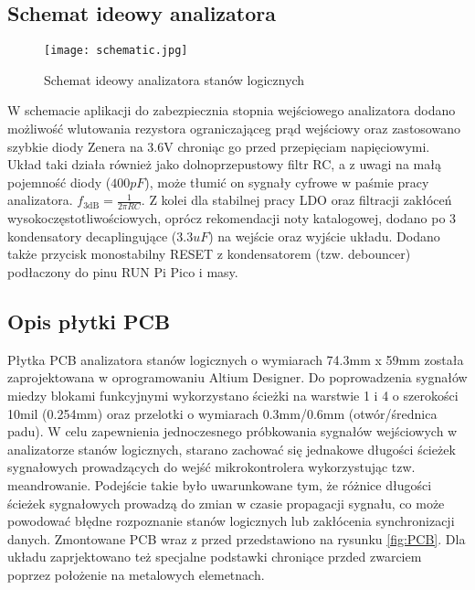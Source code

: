 \useNormalLandscape{}
\subsection{Schemat ideowy analizatora}
    \begin{figure}[!ht]
        \centering
        \texttt{[image: schematic.jpg]}
        \caption{Schemat ideowy analizatora stanów logicznych}
    \end{figure}
\usePortrait{}

    W schemacie aplikacji do zabezpiecznia stopnia wejściowego analizatora dodano możliwość wlutowania rezystora ograniczająceg
    prąd wejściowy oraz zastosowano szybkie diody Zenera na 3.6V chroniąc go przed przepięciam napięciowymi. Układ taki działa
    również jako dolnoprzepustowy filtr RC, a z uwagi na małą pojemność diody ($400pF$), może tłumić on sygnały cyfrowe w paśmie
    pracy analizatora.
    $f_{3\mathrm{dB}} = \frac{1}{2\pi RC}$. 
    Z kolei dla stabilnej pracy LDO oraz filtracji zakłóceń wysokoczęstotliwościowych, oprócz rekomendacji
    noty katalogowej, dodano po 3 kondensatory decaplingujące ($3.3uF$) na wejście oraz wyjście układu. Dodano także
    przycisk monostabilny RESET z kondensatorem (tzw. debouncer) podłaczony do pinu RUN Pi Pico i masy.




\subsection{Opis płytki PCB}

    Płytka PCB analizatora stanów logicznych o wymiarach 74.3mm x 59mm została zaprojektowana w oprogramowaniu Altium Designer.
    Do poprowadzenia sygnałów miedzy blokami funkcyjnymi wykorzystano ścieżki na warstwie 1 i 4 o szerokości 10mil (0.254mm)
    oraz przelotki o wymiarach 0.3mm/0.6mm (otwór/średnica padu). 
    W celu zapewnienia jednoczesnego próbkowania sygnałów wejściowych w analizatorze stanów logicznych, starano zachować się
    jednakowe długości ścieżek sygnałowych prowadzących do wejść mikrokontrolera wykorzystując tzw. meandrowanie.
    Podejście takie było uwarunkowane tym, że różnice długości ścieżek sygnałowych prowadzą do zmian w czasie propagacji
    sygnału, co może powodować błędne rozpoznanie stanów logicznych lub zakłócenia synchronizacji danych. Zmontowane PCB
    wraz z przed przedstawiono na rysunku \ref{fig:PCB}. Dla układu zaprjektowano też specjalne podstawki chroniące przded zwarciem
    poprzez położenie na metalowych elemetnach.
    
